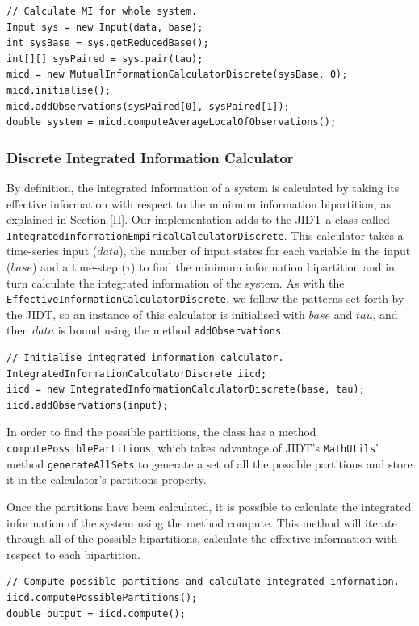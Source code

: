 \documentclass[a4paper,11pt]{article}
\begin{document}
\begin{verbatim}
// Calculate MI for whole system.
Input sys = new Input(data, base);
int sysBase = sys.getReducedBase();
int[][] sysPaired = sys.pair(tau);
micd = new MutualInformationCalculatorDiscrete(sysBase, 0);
micd.initialise();
micd.addObservations(sysPaired[0], sysPaired[1]);
double system = micd.computeAverageLocalOfObservations();
\end{verbatim}

\subsubsection{Discrete Integrated Information Calculator}

By definition, the integrated information of a system is calculated by taking its effective information with respect to the minimum information bipartition, as explained in Section \ref{II}. Our implementation adds to the JIDT a class called \texttt{IntegratedInformationEmpiricalCalculatorDiscrete}. This calculator takes a time-series input ($data$), the number of input states for each variable in the input ($base$) and a time-step ($\tau$) to find the minimum information bipartition and in turn calculate the integrated information of the system. As with the \texttt{EffectiveInformationCalculatorDiscrete}, we follow the patterns set forth by the JIDT, so an instance of this calculator is initialised with $base$ and $tau$, and then $data$ is bound using the method \texttt{addObservations}.

\begin{verbatim}
// Initialise integrated information calculator.
IntegratedInformationCalculatorDiscrete iicd;
iicd = new IntegratedInformationCalculatorDiscrete(base, tau);
iicd.addObservations(input);
\end{verbatim}

In order to find the possible partitions, the class has a method \texttt{computePossiblePartitions}, which takes advantage of JIDT's \texttt{MathUtils}' method \texttt{generateAllSets} to generate a set of all the possible partitions and store it in the calculator's partitions property.

Once the partitions have been calculated, it is possible to calculate the integrated information of the system using the method compute. This method will iterate through all of the possible bipartitions, calculate the effective information with respect to each bipartition.

\begin{verbatim}
// Compute possible partitions and calculate integrated information.
iicd.computePossiblePartitions();
double output = iicd.compute();
\end{verbatim}
\end{document}

